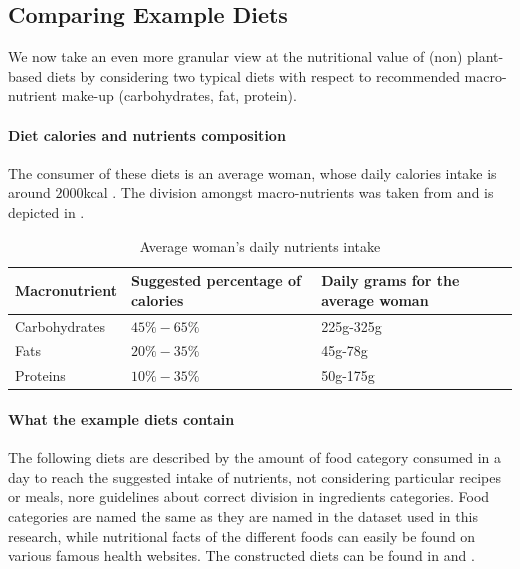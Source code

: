 \documentclass{article}
\begin{document}
\subsection{Comparing Example Diets}
We now take an even more granular view at the nutritional value of (non) plant-based diets by considering two typical diets with respect to recommended macro-nutrient make-up (carbohydrates, fat, protein).

\paragraph*{Diet calories and nutrients composition}
The consumer of these diets is an average woman, whose daily calories intake is around $2000$kcal \cite{NHS}. The division amongst macro-nutrients was taken from \citet{Healthline} and is depicted in  .

\begin{table}
  \caption{Average woman's daily nutrients intake}
  \label{tbl:composition}
  \centering
  \begin{tabular}{lll}
    \toprule
    Macronutrient     & Suggested percentage of calories   & Daily grams for the average woman  \\
    \midrule
    Carbohydrates & $45\%-65\%$ &  225g-325g  \\
    Fats    & $20\%-35\% $  & 45g-78g \\
    Proteins & $10\%-35\%$ & 50g-175g \\
    \bottomrule
  \end{tabular}
\end{table}

\paragraph*{What the example diets contain}
The following diets are described by the amount of food category consumed in a day to reach the suggested intake of nutrients, not considering particular recipes or meals, nore guidelines about correct division in ingredients categories. Food categories are named the same as they are named in the dataset used in this research, while nutritional facts of the different foods can easily be found on various famous health websites. The constructed diets can be found in  and .
\end{document}

